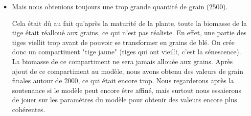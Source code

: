 \begin{itemize}
	\item Mais nous obtenions toujours une trop grande quantité de grain (2500). 

Cela était dû au fait qu'après la maturité de la plante, toute la biomasse de la tige était réalloué aux grains, ce qui n'est pas réaliste. En effet, une partie des tiges viellit trop avant de pouvoir se transformer en grains de blé. On crée donc un compartiment "tige jaune" (tiges qui ont vieilli, c'est la sénescence). La biomasse de ce compartiment ne sera jamais allouée aux grains.
Après ajout de ce compartiment au modèle, nous avons obtenu des valeurs de grain finales autour de 2000, ce qui était encore trop. 
Nous regarderons après la soutenance si le modèle peut encore être affiné, mais surtout nous essaierons de jouer sur les paramètres du modèle pour obtenir des valeurs encore plus cohérentes.


\end{itemize}

 
 






